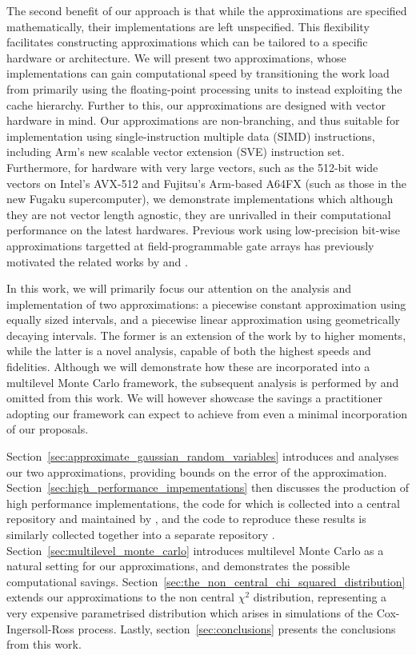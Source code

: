 \documentclass[manuscript,review]{acmart}
\begin{document}
The second benefit of our approach is that while the approximations are  specified mathematically, their implementations are left unspecified. This flexibility facilitates constructing approximations which can be tailored to a specific hardware or architecture. We will present two approximations, whose implementations can gain computational speed by transitioning the work load from primarily using the floating-point processing units to instead exploiting the cache hierarchy. Further to this, our approximations are designed with vector hardware in mind. Our approximations are non-branching, and thus suitable for implementation using single-instruction multiple data (SIMD) instructions, including Arm's new scalable vector extension (SVE) instruction set. Furthermore, for hardware with very large vectors, such as the 512-bit wide vectors on Intel's AVX-512 and Fujitsu's Arm-based A64FX (such as those in the new Fugaku supercomputer), we demonstrate implementations which although they are not vector length agnostic, they are unrivalled in their computational performance on the latest hardwares. Previous work using low-precision bit-wise approximations targetted at field-programmable gate arrays has previously motivated the related works by \citet{brugger2014mixed} and \citet{omland2015exploiting}.

In this work, we will primarily focus our attention on the analysis and implementation of two approximations: a piecewise constant approximation using equally sized intervals, and a piecewise linear approximation using geometrically decaying intervals. The former is an extension of the work by \citet[theorem~1]{giles2019random_quadrature} to higher moments, while the latter is a novel analysis, capable of both the highest speeds and fidelities. Although we will demonstrate how these are incorporated into a multilevel Monte Carlo framework, the subsequent analysis is performed by \citeauthor{giles2020approximate} \citep{giles2020approximate,sheridan2020nested} and omitted from this work. We will however showcase the savings a practitioner adopting our framework can expect to achieve from even a minimal incorporation of our proposals. 

Section~\ref{sec:approximate_gaussian_random_variables} introduces and analyses our two approximations, providing bounds on the error of the approximation. Section~\ref{sec:high_performance_impementations} then discusses the production of high performance implementations, the code for which is collected into a central repository and maintained by \citet{sheridan2020approximate_random,sheridan2020approximate_inverse}, and the code to reproduce these results is similarly collected together into a separate repository \citep{sheridan2020approximate_inverse}. Section~\ref{sec:multilevel_monte_carlo} introduces multilevel Monte Carlo as a natural setting for our approximations, and demonstrates the possible computational savings. Section~\ref{sec:the_non_central_chi_squared_distribution} extends our approximations to the non central $ \chi^2 $ distribution, representing a very expensive parametrised distribution which arises in simulations of the Cox-Ingersoll-Ross process. Lastly, section~\ref{sec:conclusions} presents the conclusions from this work. 
\end{document}
